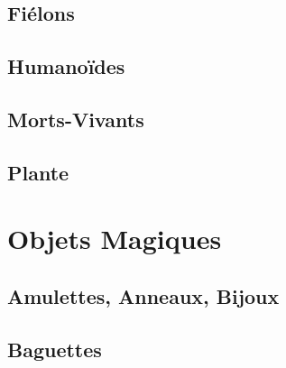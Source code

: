 \documentclass{dd}
\begin{document}
\section{Fiélons}





%



\section{Humanoïdes}











\section{Morts-Vivants}









\section{Plante}


\chapter{Objets Magiques}

\section{Amulettes, Anneaux, Bijoux} \label{OMbijoux}

%
%

\section{Baguettes} \label{OMbaguettes}
\end{document}
